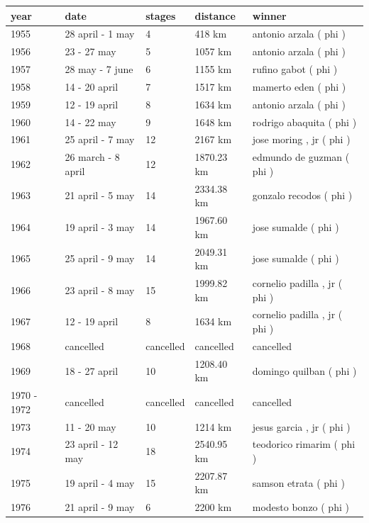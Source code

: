 \documentclass{article}
\begin{document}
\begin{tabular}{lllll}
\toprule
year & date & stages & distance & winner \\
\midrule
1955 & 28 april - 1 may & 4 & 418 km & antonio arzala ( phi ) \\
1956 & 23 - 27 may & 5 & 1057 km & antonio arzala ( phi ) \\
1957 & 28 may - 7 june & 6 & 1155 km & rufino gabot ( phi ) \\
1958 & 14 - 20 april & 7 & 1517 km & mamerto eden ( phi ) \\
1959 & 12 - 19 april & 8 & 1634 km & antonio arzala ( phi ) \\
1960 & 14 - 22 may & 9 & 1648 km & rodrigo abaquita ( phi ) \\
1961 & 25 april - 7 may & 12 & 2167 km & jose moring , jr ( phi ) \\
1962 & 26 march - 8 april & 12 & 1870.23 km & edmundo de guzman ( phi ) \\
1963 & 21 april - 5 may & 14 & 2334.38 km & gonzalo recodos ( phi ) \\
1964 & 19 april - 3 may & 14 & 1967.60 km & jose sumalde ( phi ) \\
1965 & 25 april - 9 may & 14 & 2049.31 km & jose sumalde ( phi ) \\
1966 & 23 april - 8 may & 15 & 1999.82 km & cornelio padilla , jr ( phi ) \\
1967 & 12 - 19 april & 8 & 1634 km & cornelio padilla , jr ( phi ) \\
1968 & cancelled & cancelled & cancelled & cancelled \\
1969 & 18 - 27 april & 10 & 1208.40 km & domingo quilban ( phi ) \\
1970 - 1972 & cancelled & cancelled & cancelled & cancelled \\
1973 & 11 - 20 may & 10 & 1214 km & jesus garcia , jr ( phi ) \\
1974 & 23 april - 12 may & 18 & 2540.95 km & teodorico rimarim ( phi ) \\
1975 & 19 april - 4 may & 15 & 2207.87 km & samson etrata ( phi ) \\
1976 & 21 april - 9 may & 6 & 2200 km & modesto bonzo ( phi ) \\
\bottomrule
\end{tabular}
\end{document}
